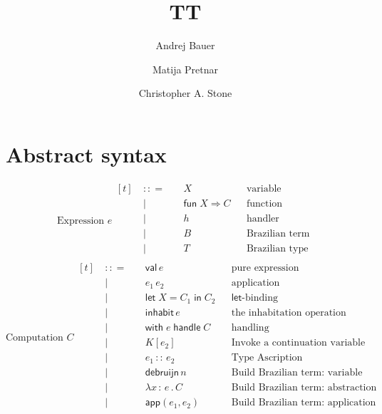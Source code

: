 \documentclass{article}
\newcommand{\bnf}{\ \mathrel{{:}{:}{=}}\ }
\newcommand{\bnfor}{\ \mid\ \ }
\newcommand{\x}{x}     %
\newcommand{\C}{C}     %
\newcommand{\K}{K}     %
\newcommand{\X}{X}     %
\newcommand{\e}{e}     %
\newcommand{\rgn}{r}   %
\newcommand{\T}{T}     %
\newcommand{\val}{\mathsf{val}\,} %
\newcommand{\letin}[1]{\mathsf{let}\; #1 \;\mathsf{in}\;} %
\newcommand{\inhabitOp}[1]{\mathsf{inhabit}\,#1} %
\newcommand{\withhandle}[1]{\mathsf{with}\;#1\;\mathsf{handle}\;} %
\newcommand{\abs}[1]{\mathsf{abs}\;#1\;\mathsf{in}\;} %
\newcommand{\new}[2]{\mathsf{new}(#1,#2)} %
\newcommand{\fun}[1]{\mathsf{fun}\;#1\Rightarrow} %
\newcommand{\app}[2]{#1\,#2} %
\newcommand{\lam}[2]{\lambda #1 \,{:}\, #2 \,.\,} %
\newcommand{\kapp}[2]{#1[#2]} %
\newcommand{\makeApp}[2]{\mathsf{app}(#1,#2)} %
\newcommand{\debruijn}[1]{\mathsf{debruijn}\,#1} %
\newcommand{\ascribe}[2]{#1 \,{:}{:}\, #2} %
\begin{document}
\title{TT}
\author{Andrej Bauer \and Matija Pretnar \and Christopher A. Stone}
\maketitle

\section{Abstract syntax}
\label{sec:abstract-syntax}

\begin{equation*}
  \text{Expression $\e$}
  \begin{aligned}[t]
    &\bnf   {} && \X          && \text{variable} \\
    &\bnfor {} && \fun{\X} \C  && \text{function} \\
    &\bnfor {} && h           && \text{handler} \\
    &\bnfor {} && B           && \text{Brazilian term} \\
    &\bnfor {} && T           && \text{Brazilian type} \\
  \end{aligned}
\end{equation*}
%
\begin{equation*}
  \text{Computation $\C$}
  \begin{aligned}[t]
    &\bnf   {} && \val \e                && \text{pure expression} \\
    &\bnfor {} && \app{\e_1}{\e_2}   && \text{application} \\
    &\bnfor {} && \letin{\X = \C_1} \C_2  && \text{$\mathsf{let}$-binding} \\
    &\bnfor {} && \inhabitOp{\e} && \text{the inhabitation operation} \\
    &\bnfor {} && \withhandle{\e} \C && \text{handling} \\
    &\bnfor {} && \kapp{\K}{\e_2}   && \text{Invoke a continuation variable} \\
    &\bnfor {} && \ascribe{\e_1}{\e_2} && \text{Type Ascription} \\
    &\bnfor {} && \debruijn{n} && \text{Build Brazilian term: variable} \\
    &\bnfor {} && \lam{\x}{\e} \C   && \text{Build Brazilian term: abstraction} \\
    &\bnfor {} && \makeApp{\e_1}{\e_2} && \text{Build Brazilian term: application} \\
  \end{aligned}
\end{equation*}
\end{document}

